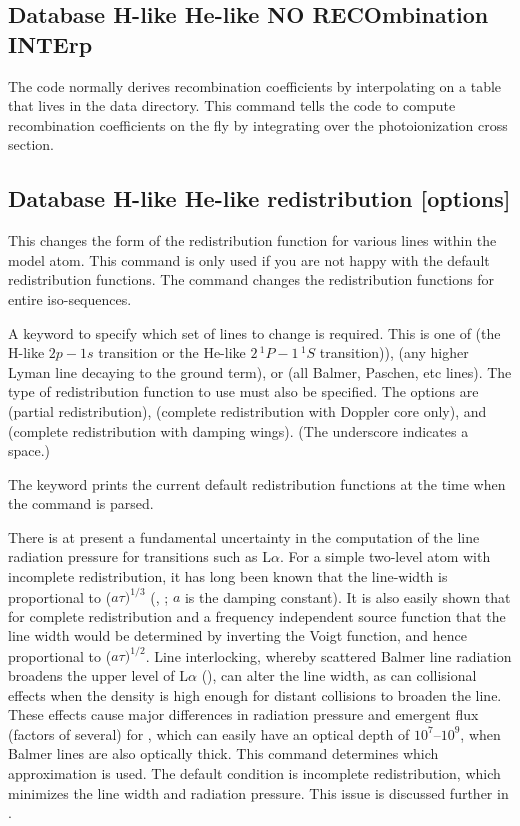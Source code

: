 \subsection{Database H-like \OR{} He-like NO RECOmbination INTErp}

The code normally derives recombination coefficients by interpolating
on a table that lives in the data directory.
This command tells the code
to compute recombination coefficients on the fly by integrating over the
photoionization cross section.

\subsection{Database H-like \OR{} He-like  redistribution [options]}

This changes the form of the redistribution
function for various lines within the model atom.
This command is only
used if you are not happy with the default redistribution functions.
The command changes the redistribution functions for entire iso-sequences.

A keyword to specify which set of lines to change is required.
This is one of  (the H-like $2p - 1s$ transition or the He-like
$2\, ^1P - 1\, ^1S$ transition)),  (any higher Lyman line
decaying to the ground term), or 
(all Balmer, Paschen, etc lines).
The type of redistribution function to use must also be specified.
The options are  (partial redistribution),  (complete redistribution
with Doppler core only), and 
(complete redistribution with damping wings).
(The underscore indicates a space.)

The keyword  prints the current default
redistribution functions at the time when the command is parsed.

There is at present a fundamental uncertainty in the computation of the
line radiation pressure for transitions such as L$\alpha $.
For a simple two-level
atom with incomplete redistribution, it has long been known that the
line-width is proportional to ($a\tau)^{1/3}$
(\citealp{Adams1972}, \citealp{Harrington1973}; $a$ is
the damping constant).  It is also easily shown that for complete
redistribution and a frequency independent source function that the line
width would be determined by inverting the Voigt function, and hence
proportional to ($a\tau)^{1/2}$.
Line interlocking, whereby scattered Balmer line
radiation broadens the upper level of L$\alpha$
(\citealp{Hubbard1985}), can
alter the line width, as can collisional effects when the density is high
enough for distant collisions to broaden the line.
These effects cause
major differences in radiation pressure and emergent flux (factors of
several) for \la, which can easily have an optical depth of
$10^7$--$10^9$, when
Balmer lines are also optically thick.  
This command determines which
approximation is used.
The default condition is incomplete redistribution,
which minimizes the line width and radiation pressure.  This issue is
discussed further in \citet{Elitzur1986}.


